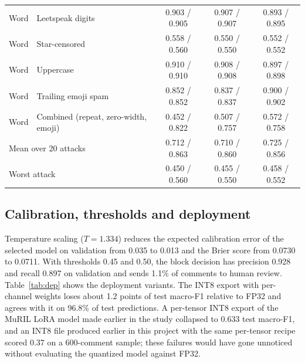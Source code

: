 \documentclass{svproc}
\begin{document}
\begin{table}[t]
{\begin{tabular}{llccc}
Word & Leetspeak digits & 0.903 / 0.905 & 0.907 / 0.907 & 0.893 / 0.895 \\
Word & Star-censored & 0.558 / 0.560 & 0.550 / 0.550 & 0.552 / 0.552 \\
Word & Uppercase & 0.910 / 0.910 & 0.908 / 0.908 & 0.897 / 0.898 \\
Word & Trailing emoji spam & 0.852 / 0.852 & 0.837 / 0.837 & 0.900 / 0.902 \\
Word & Combined (repeat, zero-width, emoji) & 0.452 / 0.822 & 0.507 / 0.757 & 0.572 / 0.758 \\
\midrule
\multicolumn{2}{l}{Mean over 20 attacks} & 0.712 / 0.863 & 0.710 / 0.860 & 0.725 / 0.856 \\
\multicolumn{2}{l}{Worst attack} & 0.450 / 0.560 & 0.455 / 0.550 & 0.458 / 0.552 \\
\bottomrule
\end{tabular}}
\end{table}

\subsection{Calibration, thresholds and deployment}
Temperature scaling ($T = 1.334$) reduces the expected calibration error of the selected model on validation from 0.035 to 0.013 and the Brier score from 0.0730 to 0.0711. With thresholds 0.45 and 0.50, the block decision has precision 0.928 and recall 0.897 on validation and sends 1.1\% of comments to human review. Table~\ref{tab:dep} shows the deployment variants. The INT8 export with per-channel weights loses about 1.2 points of test macro-F1 relative to FP32 and agrees with it on 96.8\% of test predictions. A per-tensor INT8 export of the MuRIL LoRA model made earlier in the study collapsed to 0.633 test macro-F1, and an INT8 file produced earlier in this project with the same per-tensor recipe scored 0.37 on a 600-comment sample; these failures would have gone unnoticed without evaluating the quantized model against FP32.

\begin{table}[t]
\caption{Deployment variants of the selected XLM-R LoRA model (seed 2024; LoRA weights merged into the base model before export) and the TF-IDF + SVM baseline. Median latency per comment including tokenization, batch size one, on an Intel Core i7-13700 CPU (8 P-cores, 3.4 GHz, no GPU), with 1 and 4 CPU threads. The SVM runs single-threaded.}
\label{tab:dep}
\centering
\scriptsize
\setlength{\tabcolsep}{4pt}
\renewcommand{\arraystretch}{0.95}
\end{table}
\end{document}
